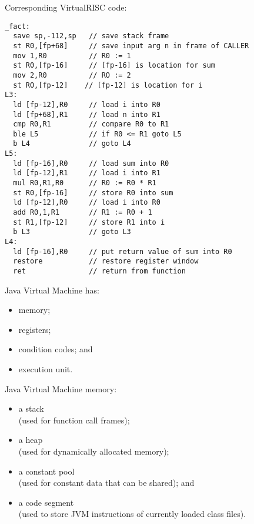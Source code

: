 \begin{slide*}
Corresponding VirtualRISC code:\\

\begin{tt}
\begin{scriptsize}
\begin{verbatim}
_fact:
  save sp,-112,sp   // save stack frame
  st R0,[fp+68]     // save input arg n in frame of CALLER
  mov 1,R0          // R0 := 1
  st R0,[fp-16]     // [fp-16] is location for sum
  mov 2,R0          // RO := 2
  st RO,[fp-12]    // [fp-12] is location for i
L3:
  ld [fp-12],R0     // load i into R0
  ld [fp+68],R1     // load n into R1
  cmp R0,R1         // compare R0 to R1
  ble L5            // if R0 <= R1 goto L5
  b L4              // goto L4
L5:
  ld [fp-16],R0     // load sum into R0
  ld [fp-12],R1     // load i into R1
  mul R0,R1,R0      // R0 := R0 * R1
  st R0,[fp-16]     // store R0 into sum
  ld [fp-12],R0     // load i into R0
  add R0,1,R1       // R1 := R0 + 1
  st R1,[fp-12]     // store R1 into i
  b L3              // goto L3
L4:
  ld [fp-16],R0     // put return value of sum into R0
  restore           // restore register window
  ret               // return from function
\end{verbatim}
\end{scriptsize}
\end{tt}
\vfil
\end{slide*}

\begin{slide*}
Java Virtual Machine has:
\begin{itemize}
\item memory;
\item registers;
\item condition codes; and
\item execution unit.
\end{itemize}
\vfil
\end{slide*}

\begin{slide*}
Java Virtual Machine memory:
\begin{itemize}
\item a stack\\(used for function call frames);
\item a heap\\(used for dynamically allocated memory);
\item a constant pool\\(used for constant data that can be shared); and
\item a code segment\\(used to store JVM instructions of currently loaded
                     class files).
\end{itemize}
\vfil
\end{slide*}
 
